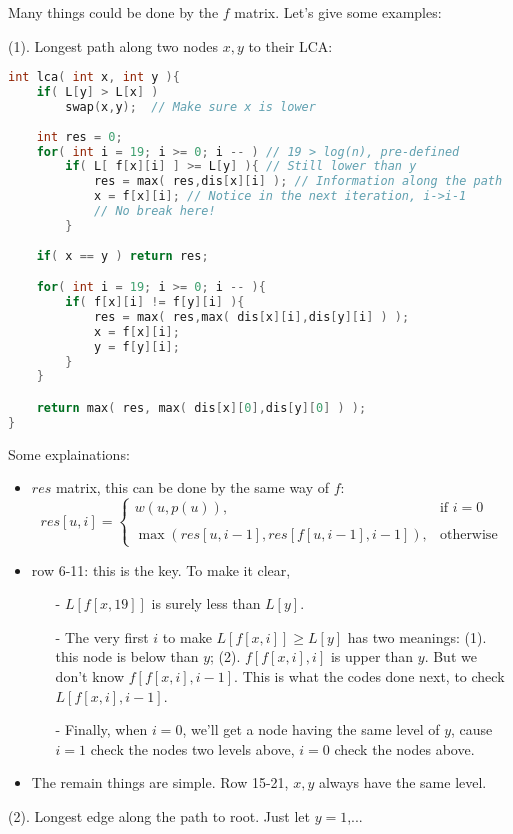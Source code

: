 \documentclass[a4 paper]{article}
\begin{document}
Many things could be done by the $f$ matrix. Let's give some examples:

(1). Longest path along two nodes $x,y$ to their LCA:
\begin{lstlisting}[language=C++]
int lca( int x, int y ){
	if( L[y] > L[x] )
		swap(x,y);  // Make sure x is lower
	
	int res = 0;
	for( int i = 19; i >= 0; i -- ) // 19 > log(n), pre-defined
		if( L[ f[x][i] ] >= L[y] ){ // Still lower than y
			res = max( res,dis[x][i] ); // Information along the path
			x = f[x][i]; // Notice in the next iteration, i->i-1
			// No break here!
		}
	
	if( x == y ) return res;

	for( int i = 19; i >= 0; i -- ){
		if( f[x][i] != f[y][i] ){
			res = max( res,max( dis[x][i],dis[y][i] ) );
			x = f[x][i];
			y = f[y][i];
		}
	}

	return max( res, max( dis[x][0],dis[y][0] ) );
}
\end{lstlisting}
Some explainations:
\begin{itemize}
	\item $res$ matrix, this can be done by the same way of $f$:
	\[
			res[u,i] =\left\{ \begin{array}{ll}
				w(u,p(u)),& \text{if }i=0\\
				\\
				\max (res[u,i-1],res[ f[u,i-1],i-1 ]),&\text{otherwise}
			\end{array}
		\right.
	\]
	\item row 6-11: this is the key. To make it clear,
	\begin{itemize}
		\item[-] $L[f[x,19]]$ is surely less than $L[y]$.
		\item[-] The very first $i$ to make $L[f[x,i]] \ge L[y]$ has two meanings: (1). this node is below than $y$; (2). $f[ f[x,i],i ]$ is upper than $y$. But we don't know $f[ f[x,i],i-1 ]$. This is what the codes done next, to check $L[ f[x,i],i-1 ]$. 
		\item[-] Finally, when $i=0$, we'll get a node having the same level of $y$, cause $i=1$ check the nodes two levels above, $i=0$ check the nodes above.
	\end{itemize}
	\item The remain things are simple. Row 15-21, $x,y$ always have the same level.
\end{itemize}

(2). Longest edge along the path to root. Just let $y=1$,...
\end{document}
